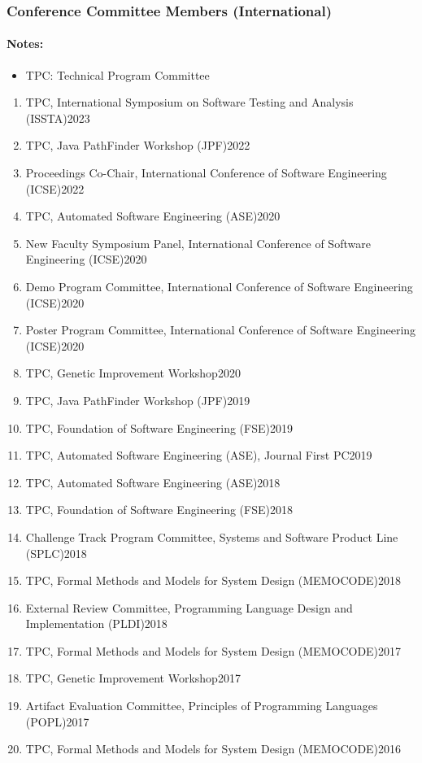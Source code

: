 \documentclass[11pt]{article}
\begin{document}
\subsubsection{Conference Committee Members (International)}

\paragraph{Notes:}
\begin{itemize}
\item[] TPC: Technical Program Committee
\end{itemize}

\begin{enumerate}
\item TPC,  International Symposium on Software Testing and Analysis (ISSTA)\hfill 2023  
\item TPC, Java PathFinder Workshop (JPF)\hfill 2022
\item Proceedings Co-Chair,  International Conference of Software Engineering (ICSE)\hfill 2022
\item TPC, Automated Software Engineering (ASE)\hfill 2020
\item New Faculty Symposium Panel, International Conference of Software Engineering (ICSE)\hfill 2020
\item Demo Program Committee, International Conference of Software Engineering (ICSE)\hfill 2020
\item Poster Program Committee, International Conference of Software Engineering (ICSE)\hfill 2020
\item TPC, Genetic Improvement Workshop\hfill 2020
\item TPC, Java PathFinder Workshop (JPF)\hfill 2019
\item TPC, Foundation of Software Engineering (FSE)\hfill 2019
\item TPC, Automated Software Engineering (ASE), Journal First PC\hfill 2019
\item TPC, Automated Software Engineering (ASE)\hfill 2018
\item TPC, Foundation of Software Engineering (FSE)\hfill 2018
\item Challenge Track Program Committee, Systems and Software Product Line (SPLC)\hfill 2018
\item TPC, Formal Methods and Models for System Design (MEMOCODE)\hfill 2018
\item External Review Committee, Programming Language Design and Implementation (PLDI)\hfill 2018
\item TPC, Formal Methods and Models for System Design (MEMOCODE)\hfill 2017
\item TPC, Genetic Improvement Workshop\hfill 2017
\item Artifact Evaluation Committee, Principles of Programming Languages (POPL)\hfill 2017
\item TPC, Formal Methods and Models for System Design (MEMOCODE)\hfill 2016
\end{enumerate}
\end{document}
